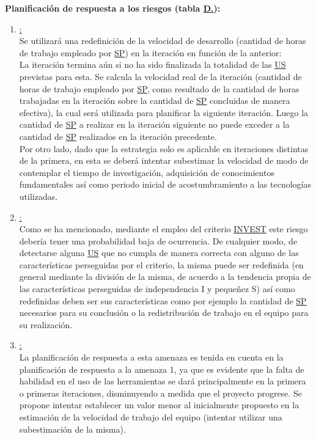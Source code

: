 \documentclass[a4paper, 12pt,twoside]{report}  %
\numberwithin{equation}{subsection} %
\begin{document}
\textbf{Planificación de respuesta a los riesgos (tabla \hyperref[tabla_riesgos]{D.\tempTblRiesgos}):}
\begin{enumerate}
	\item \underline{\hypertarget{planificacion_respuesta_riesgo_uno}{}:}\\
	Se utilizará una redefinición de la velocidad de desarrollo (cantidad de horas de trabajo empleado por \hyperlink{SP}{SP}) en la iteración en función de la anterior:\\
	La iteración termina aún si no ha sido finalizada la totalidad de las \hyperlink{US}{US} previstas para esta. Se calcula la velocidad real de la iteración (cantidad de horas de trabajo empleado por \hyperlink{SP}{SP}, como resultado de la cantidad de horas trabajadas en la iteración sobre la cantidad de \hyperlink{SP}{SP} concluidas de manera efectiva), la cual será utilizada para planificar la siguiente iteración. Luego la cantidad de \hyperlink{SP}{SP} a realizar en la iteración siguiente no puede exceder a la cantidad de \hyperlink{SP}{SP} realizados en la iteración precedente.\\
	\indent Por otro lado, dado que la estrategia solo es aplicable en iteraciones distintas de la primera, en esta se deberá intentar subestimar la velocidad de modo de contemplar el tiempo de investigación, adquisición de conocimientos fundamentales así como periodo inicial de acostumbramiento a las tecnologías utilizadas.
	\item \underline{:}\\
	Como se ha mencionado, mediante el empleo del criterio \hyperlink{INVEST}{INVEST} este riesgo debería tener una probabilidad baja de ocurrencia. De cualquier modo, de detectarse alguna \hyperlink{US}{US} que no cumpla de manera correcta con alguno de las características perseguidas por el criterio, la misma puede ser redefinida (en general mediante la división de la misma, de acuerdo a la tendencia propia de las características perseguidas de independencia I y pequeñez S) así como redefinidas deben ser sus características como por ejemplo la cantidad de \hyperlink{SP}{SP} necesarios para su conclusión o la redistribución de trabajo en el equipo para su realización.
	\item \underline{:}\\
	La planificación de respuesta a esta amenaza es tenida en cuenta en la planificación de respuesta a la amenaza 1, ya que es evidente que la falta de habilidad en el uso de las herramientas se dará principalmente en la primera o primeras iteraciones, disminuyendo a medida que el proyecto progrese. Se propone intentar establecer un valor menor al inicialmente propuesto en la estimación de la velocidad de trabajo del equipo (intentar utilizar una subestimación de la misma).

\end{enumerate}
\end{document}
